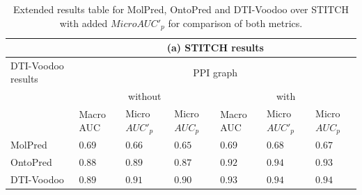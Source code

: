\documentclass[]{article}
\newcommand{\name}{DTI-Voodoo}
\begin{document}
\begin{table}[ht]
	\centering
	\begin{tabular}{|p{2.0cm}|p{0.8cm}|p{0.8cm}|p{0.8cm}|p{0.8cm}|p{0.8cm}|p{0.8cm}|}
		\hline
		&\multicolumn{6}{c|}{(a) STITCH results}\\
		\hline
		\name{} results&\multicolumn{6}{c|}{PPI graph}\\
		&\multicolumn{3}{c|}{without}&\multicolumn{3}{c|}{with}\\
		&Macro AUC&Micro $AUC'_p$&Micro $AUC_p$&Macro AUC&Micro $AUC'_p$&Micro $AUC_p$\\
		\hline
		MolPred&$0.69$&$0.66$&$0.65$&$0.69$&$0.68$&$0.67$\\
		\hline
		OntoPred&$0.88$&$0.89$&$0.87$&$0.92$&$0.94$&$0.93$\\
		\hline
		\name{} & $0.89$& $0.91$ & $0.90$&$\mathbf{0.93}$&$\mathbf{0.94}$&$\mathbf{0.94}$\\
		\hline
	\end{tabular}
	\caption{Extended results table for MolPred, OntoPred and \name{} over STITCH with added $MicroAUC'_p$ for comparison of both metrics.}
\end{table}
\end{document}
